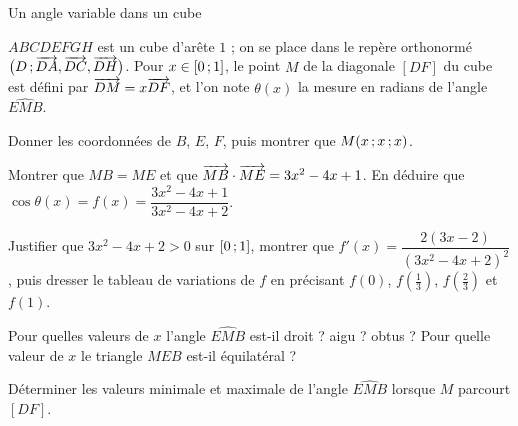 \begin{exercice}[3]{Un angle variable dans un cube}
\begin{codecote}[0.6]
$ABCDEFGH$ est un cube d'arête $1$ ; on se place dans le repère orthonormé $\big(D\,{;}\,\overrightarrow{DA},\overrightarrow{DC},\overrightarrow{DH}\big)$. Pour
$x\in\mathopen{[}0\,{;}\,1\mathclose{]}$, le point $M$ de la diagonale $[DF]$ du cube est défini par $\overrightarrow{DM}=x\overrightarrow{DF}$, et l'on note $\theta(x)$ la mesure en
radians de l'angle $\widehat{EMB}$.
\begin{questions}
  \item Donner les coordonnées de $B$, $E$, $F$, puis montrer que $M(x\,{;}\, x\,{;}\, x)$.
  \item Montrer que $MB=ME$ et que $\overrightarrow{MB}\cdot\overrightarrow{ME}=3x^2-4x+1$. En déduire que
    $\cos\theta(x)=f(x)=\dfrac{3x^2-4x+1}{3x^2-4x+2}$.
\end{questions}
\cote
\centering
{}
\end{codecote}
\begin{questions}[start=3]
  \item Justifier que $3x^2-4x+2>0$ sur $\mathopen{[}0\,{;}\,1\mathclose{]}$, montrer que $f'(x)=\dfrac{2(3x-2)}{(3x^2-4x+2)^2}$, puis dresser le tableau de
    variations de $f$ en précisant $f(0)$, $f\left(\frac13\right)$, $f\left(\frac23\right)$ et $f(1)$.
  \item Pour quelles valeurs de $x$ l'angle $\widehat{EMB}$ est-il droit ? aigu ? obtus ? Pour quelle valeur de $x$ le triangle $MEB$
    est-il équilatéral ?
  \item Déterminer les valeurs minimale et maximale de l'angle $\widehat{EMB}$ lorsque $M$ parcourt $[DF]$.
\end{questions}
\end{exercice}

